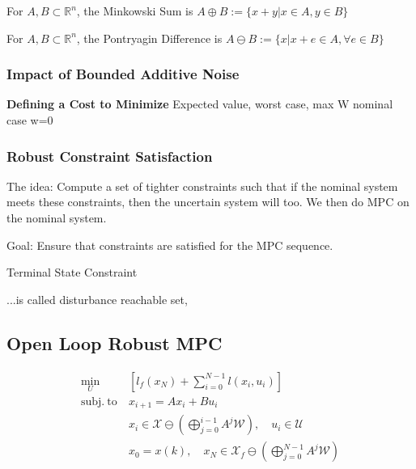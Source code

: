 
\begin{definition}
	For $A, B \subset \mathbb{R}^{n}$,
	the Minkowski Sum is
	$A \oplus B := \{x + y | x \in A, y \in B\}$
\end{definition}

\begin{definition}
	For $A, B \subset \mathbb{R}^{n}$,
	the Pontryagin Difference is
	$A \ominus B := \{x | x+e \in A, \forall e \in B\}$
\end{definition}

\subsubsection{Impact of Bounded Additive Noise}

\textbf{Defining a Cost to Minimize}
Expected value,
worst case, max W
nominal case w=0

\subsubsection{Robust Constraint Satisfaction}

The idea: Compute a set of tighter constraints such that if the nominal
system meets these constraints, then the uncertain system will too.
We then do MPC on the nominal system.

Goal: Ensure that constraints are satisfied for the MPC sequence.

Terminal State Constraint

...is called disturbance reachable set,

\subsection{Open Loop Robust MPC}
\begin{align*}
	\min_U                & \left[ l_f(x_N) + \textstyle\sum_{i=0}^{N-1} l(x_i, u_i) \right]                                    \\
	\mathrm{subj.\ to }\  & x_{i+1} = A x_i + B u_i                                                                             \\
	                      & x_i \in \mathcal{X} \ominus ( \textstyle\bigoplus_{j=0}^{i-1} A^j \mathcal{W} ), \quad
	u_i \in \mathcal{U}                                                                                                         \\
	                      & x_0 = x(k), \quad x_N \in \mathcal{X}_f \ominus ( \textstyle\bigoplus_{j=0}^{N-1} A^j \mathcal{W} )
\end{align*}

